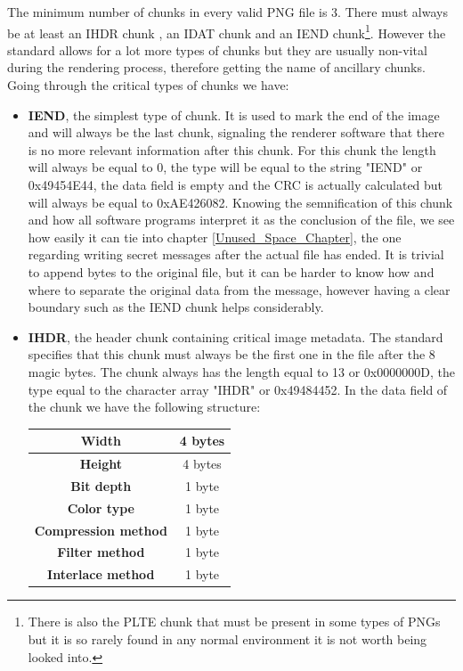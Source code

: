 \begin{multicols*}{2}
The minimum number of chunks in every valid PNG file is 3. There must always be at least an IHDR chunk , an IDAT chunk and an IEND chunk\footnote{There is also the PLTE chunk that must be present in some types of PNGs but it is so rarely found in any normal environment it is not worth being looked into.}. However the standard allows for a lot more types of chunks but they are usually non-vital during the rendering process, therefore getting the name of ancillary chunks. Going through the critical types of chunks we have:
\begin{itemize}
	\item \textbf{IEND}, the simplest type of chunk. It is used to mark the end of the image and will always be the last chunk, signaling the renderer software that there is no more relevant information after this chunk. For this chunk the length will always be equal to 0, the type will be equal to the string "IEND" or 0x49454E44, the data field is empty and the CRC is actually calculated but will always be equal to 0xAE426082. Knowing the semnification of this chunk and how all software programs interpret it as the conclusion of the file, we see how easily it can tie into chapter \ref{Unused_Space_Chapter}, the one regarding writing secret messages after the actual file has ended. It is trivial to append bytes to the original file, but it can be harder to know how and where to separate the original data from the message, however having a clear boundary such as the IEND chunk helps considerably.
	\item \textbf{IHDR}, the header chunk containing critical image metadata. The standard specifies that this chunk must always be the first one in the file after the 8 magic bytes. The chunk always has the length equal to 13 or 0x0000000D, the type equal to the character array "IHDR" or 0x49484452. In the data field of the chunk we have the following structure:
\begin{center}
\begin{tabular}{|c|c|}
\hline
\textbf{Width} & 4 bytes \\ \hline
\textbf{Height} & 4 bytes \\ \hline
\textbf{Bit depth} & 1 byte \\ \hline
\textbf{Color type} & 1 byte \\ \hline
\textbf{Compression method} & 1 byte \\ \hline
\textbf{Filter method} & 1 byte \\ \hline
\textbf{Interlace method} & 1 byte \\ \hline

\end{tabular}
\end{center}
\end{itemize}
\end{multicols*}
